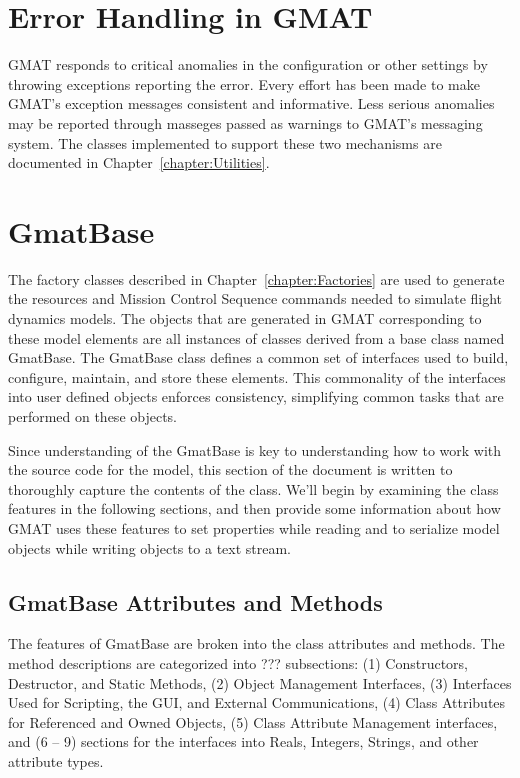\section{Error Handling in GMAT}

GMAT responds to critical anomalies in the configuration or other settings by throwing exceptions
reporting the error.  Every effort has been made to make GMAT's exception messages consistent and
informative.  Less serious anomalies may be reported through masseges passed as warnings to GMAT's
messaging system.  The classes implemented to support these two mechanisms are documented in
Chapter~\ref{chapter:Utilities}.

\section{\label{section:GmatBase}GmatBase}

The factory classes described in Chapter~\ref{chapter:Factories} are used to generate the resources
and Mission Control Sequence commands needed to simulate flight dynamics models.  The objects that
are generated in GMAT corresponding to these model elements are all instances of classes derived
from a base class named GmatBase.  The GmatBase class defines a common set of interfaces used to
build, configure, maintain, and store these elements.  This commonality of the interfaces into user
defined objects enforces consistency, simplifying common tasks that are performed on these objects.

Since understanding of the GmatBase is key to understanding how to work with the source code for
the model, this section of the document is written to thoroughly capture the contents of the class.
We'll begin by examining the class features in the following sections, and then provide some
information about how GMAT uses these features to set properties while reading and to serialize
model objects while writing objects to a text stream.

\subsection{GmatBase Attributes and Methods}

The features of GmatBase are broken into the class attributes and methods.  The method descriptions
are categorized into ??? subsections: (1) Constructors, Destructor, and Static Methods, (2) Object
Management Interfaces, (3) Interfaces Used for Scripting, the GUI, and External Communications, (4)
Class Attributes for Referenced and Owned Objects, (5) Class Attribute Management interfaces, and
(6 -- 9) sections for the interfaces into Reals, Integers, Strings, and other attribute types.

